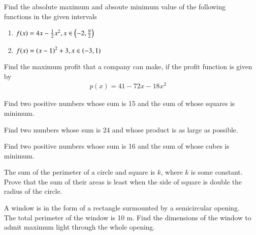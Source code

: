 %

\item Find the absolute maximum and absoute minimum value of the following functions in the given intervals
%
\begin{enumerate}
\item $f(x) = 4x - \frac{1}{2}x^2, x \in \left(-2,\frac{9}{2}\right)$
\item $f(x) = \left(x-1\right)^2 + 3,  x \in \left(-3,1\right)$
\end{enumerate}
%
\item Find the maximum profit that a company can make, if the profit function is given by
\begin{align}
p(x) = 41-72x - 18x^2
\end{align}
%
\item Find two positive numbers whose sum is 15 and the sum of whose squares is minimum.
\item Find two numbers whose sum is 24 and whose product is as large as possible.
\item Find two positive numbers whose sum is 16 and the sum of whose cubes is minimum.
\item The sum of the perimeter of a circle and square is $k$, where $k$ is some constant. Prove that the sum of their areas is least when the side of square is double the radius of the circle.
\item A window is in the form of a rectangle surmounted by a semicircular opening. The total perimeter of the window is 10 m. Find the dimensions of the window to admit maximum light through the whole opening.

